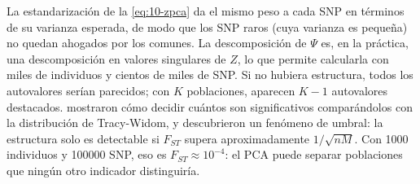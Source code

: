 La estandarización de la \cref{eq:10-zpca} da el mismo peso a cada SNP en términos de su varianza esperada, de modo que los SNP raros (cuya varianza es pequeña) no quedan ahogados por los comunes. La descomposición de $\Psi$ es, en la práctica, una descomposición en valores singulares de $Z$, lo que permite calcularla con miles de individuos y cientos de miles de SNP. Si no hubiera estructura, todos los autovalores serían parecidos; con $K$ poblaciones, aparecen $K-1$ autovalores destacados. \textcite{c10-patterson2006} mostraron cómo decidir cuántos son significativos comparándolos con la distribución de Tracy-Widom, y descubrieron un fenómeno de umbral: la estructura solo es detectable si $F_{ST}$ supera aproximadamente $1/\sqrt{nM}$. Con \num{1000} individuos y \num{100000} SNP, eso es $F_{ST}\approx10^{-4}$: el PCA puede separar poblaciones que ningún otro indicador distinguiría.

